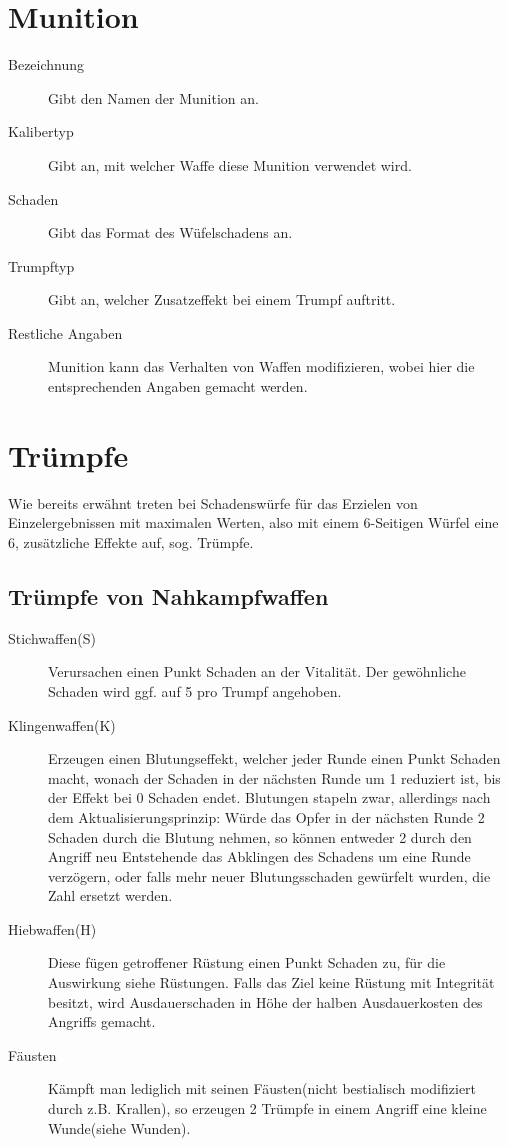 \documentclass[a4paper,12pt,oneside]{book}
\begin{document}
\section{Munition}
\begin{description}
\item[Bezeichnung] Gibt den Namen der Munition an.
\item[Kalibertyp] Gibt an, mit welcher Waffe diese Munition verwendet wird. 
\item[Schaden] Gibt das Format des Wüfelschadens an.
\item[Trumpftyp] Gibt an, welcher Zusatzeffekt bei einem Trumpf auftritt.
\item[Restliche Angaben] Munition kann das Verhalten von Waffen modifizieren, wobei hier die entsprechenden Angaben gemacht werden.
\end{description}


\section{Trümpfe}
Wie bereits erwähnt treten bei Schadenswürfe für das Erzielen von Einzelergebnissen mit maximalen Werten, also mit einem 6-Seitigen Würfel eine 6, zusätzliche Effekte auf, sog. Trümpfe.
\subsection{Trümpfe von Nahkampfwaffen}
\begin{description}
\item[Stichwaffen(S)] Verursachen einen Punkt Schaden an der Vitalität. Der gewöhnliche Schaden wird ggf. auf 5 pro Trumpf angehoben.
\item[Klingenwaffen(K)] Erzeugen einen Blutungseffekt, welcher jeder Runde einen Punkt Schaden macht, wonach der Schaden in der nächsten Runde um 1 reduziert ist, bis der Effekt bei 0 Schaden endet. Blutungen stapeln zwar, allerdings nach dem Aktualisierungsprinzip: Würde das Opfer in der nächsten Runde 2 Schaden durch die Blutung nehmen, so können entweder 2 durch den Angriff neu Entstehende das Abklingen des Schadens um eine Runde verzögern, oder falls mehr neuer Blutungsschaden gewürfelt wurden, die Zahl ersetzt werden.
\item[Hiebwaffen(H)] Diese fügen getroffener Rüstung einen Punkt Schaden zu, für die Auswirkung siehe Rüstungen. Falls das Ziel keine Rüstung mit Integrität besitzt, wird Ausdauerschaden in Höhe der halben Ausdauerkosten des Angriffs gemacht.
\item[Fäusten] Kämpft man lediglich mit seinen Fäusten(nicht bestialisch modifiziert durch z.B. Krallen), so erzeugen 2 Trümpfe in einem Angriff eine kleine Wunde(siehe Wunden).
\end{description}
\end{document}
